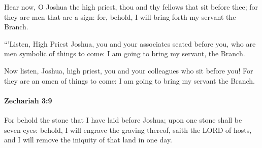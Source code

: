 			\begin{versebox}
					\item[BHS] 
					\item[LXX] 
					\item[ASV] Hear now, O Joshua the high priest, thou and thy fellows that sit before thee; for they are men that are a sign: for, behold, I will bring forth my servant the Branch.
					\item[NIV] “’Listen, High Priest Joshua, you and your associates seated before you, who are men symbolic of things to come: I am going to bring my servant, the Branch.
					\item[NRSV] Now listen, Joshua, high priest, you and your colleagues who sit before you! For they are an omen of things to come: I am going to bring my servant the Branch.
			\end{versebox}

		\paragraph{Zechariah 3:9} %
			\label{ZECHARIAH-3-9}

			For behold the stone that I have laid before Joshua; upon one stone shall be seven eyes: behold, I will engrave the graving thereof, saith the LORD of hosts, and I will remove the iniquity of that land in one day.

